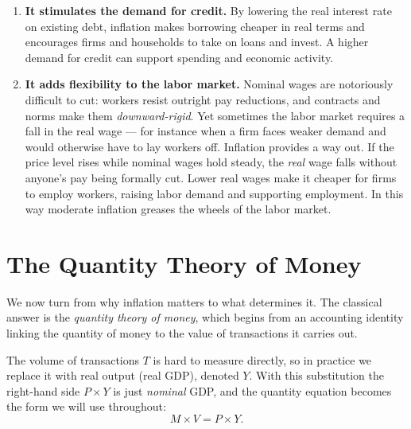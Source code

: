 \begin{enumerate}
    \item \textbf{It stimulates the demand for credit.} By lowering the real interest rate on existing debt, inflation makes borrowing cheaper in real terms and encourages firms and households to take on loans and invest. A higher demand for credit can support spending and economic activity.

    \item \textbf{It adds flexibility to the labor market.} Nominal wages are notoriously difficult to cut: workers resist outright pay reductions, and contracts and norms make them \emph{downward-rigid}. Yet sometimes the labor market requires a fall in the real wage --- for instance when a firm faces weaker demand and would otherwise have to lay workers off. Inflation provides a way out. If the price level rises while nominal wages hold steady, the \emph{real} wage falls without anyone's pay being formally cut. Lower real wages make it cheaper for firms to employ workers, raising labor demand and supporting employment. In this way moderate inflation greases the wheels of the labor market.
\end{enumerate}

\section{The Quantity Theory of Money}

We now turn from why inflation matters to what determines it. The classical answer is the \emph{quantity theory of money}, which begins from an accounting identity linking the quantity of money to the value of transactions it carries out.


The volume of transactions $T$ is hard to measure directly, so in practice we replace it with real output (real GDP), denoted $Y$. With this substitution the right-hand side $P \times Y$ is just \emph{nominal} GDP, and the quantity equation becomes the form we will use throughout:
\begin{equation}
M \times V = P \times Y.
\label{eq:qty-eqn}
\end{equation}

